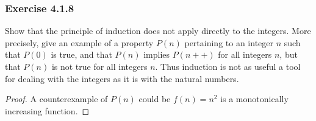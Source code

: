 \documentclass[12pt, letter]{article}
\begin{document}
\subsubsection*{Exercise 4.1.8}
Show that the principle of induction does not apply directly to the integers. More precisely, give an example of a property $P(n)$ pertaining to an integer $n$
such that $P(0)$ is true, and that $P(n)$ implies $P(n++)$ for all integers $n$, but that $P(n)$ is not true for all integers $n$. Thus induction is not as useful a tool for
dealing with the integers as it is with the natural numbers.
\begin{proof}
    A counterexample of $P(n)$ could be $f(n)=n^2$ is a monotonically increasing function. 
\end{proof}
\end{document}
